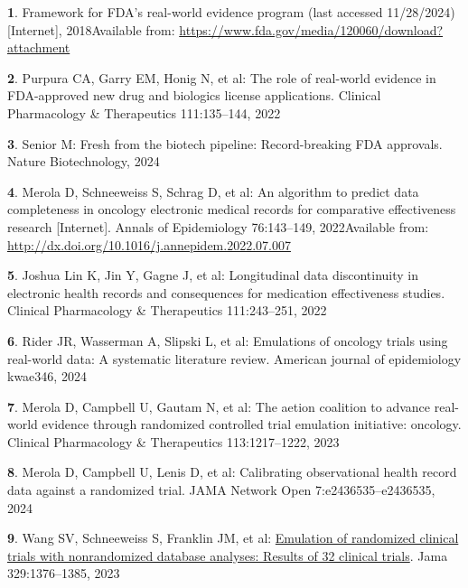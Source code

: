 \documentclass[
  letterpaper,
  DIV=11,
  numbers=noendperiod]{scrartcl}
\newlength{\cslhangindent}
\newenvironment{CSLReferences}[2] %
 {\begin{list}{}{%
  \setlength{\itemindent}{0pt}
  \setlength{\leftmargin}{0pt}
  \setlength{\parsep}{0pt}
  \ifodd #1
   \setlength{\leftmargin}{\cslhangindent}
   \setlength{\itemindent}{-1\cslhangindent}
  \fi
  \setlength{\itemsep}{#2\baselineskip}}}
 {\end{list}}
\begin{document}
\label{refs}
\begin{CSLReferences}{0}{1}
\textbf{1}. Framework for FDA's real-world evidence program (last
accessed 11/28/2024) {[}Internet{]}, 2018Available from:
\url{https://www.fda.gov/media/120060/download?attachment}

\textbf{2}. Purpura CA, Garry EM, Honig N, et al: The role of real-world
evidence in FDA-approved new drug and biologics license applications.
Clinical Pharmacology \& Therapeutics 111:135--144, 2022

\textbf{3}. Senior M: Fresh from the biotech pipeline: Record-breaking
FDA approvals. Nature Biotechnology, 2024

\textbf{4}. Merola D, Schneeweiss S, Schrag D, et al: An algorithm to
predict data completeness in oncology electronic medical records for
comparative effectiveness research {[}Internet{]}. Annals of
Epidemiology 76:143--149, 2022Available from:
\url{http://dx.doi.org/10.1016/j.annepidem.2022.07.007}

\textbf{5}. Joshua Lin K, Jin Y, Gagne J, et al: Longitudinal data
discontinuity in electronic health records and consequences for
medication effectiveness studies. Clinical Pharmacology \& Therapeutics
111:243--251, 2022

\textbf{6}. Rider JR, Wasserman A, Slipski L, et al: Emulations of
oncology trials using real-world data: A systematic literature review.
American journal of epidemiology kwae346, 2024

\textbf{7}. Merola D, Campbell U, Gautam N, et al: The aetion coalition
to advance real-world evidence through randomized controlled trial
emulation initiative: oncology. Clinical Pharmacology \& Therapeutics
113:1217--1222, 2023

\textbf{8}. Merola D, Campbell U, Lenis D, et al: Calibrating
observational health record data against a randomized trial. JAMA
Network Open 7:e2436535--e2436535, 2024

\textbf{9}. Wang SV, Schneeweiss S, Franklin JM, et al:
\href{https://doi.org/10.1001/jama.2023.4221}{Emulation of randomized
clinical trials with nonrandomized database analyses: Results of 32
clinical trials}. Jama 329:1376--1385, 2023


\end{CSLReferences}
\end{document}
